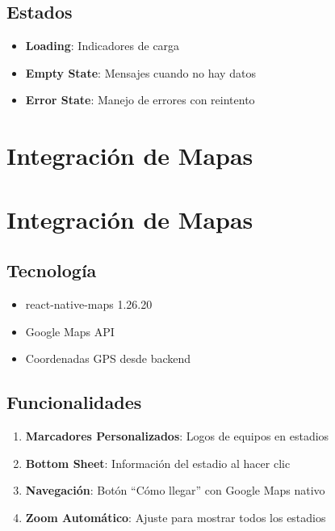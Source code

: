 \documentclass[
  spanish,
  11pt,
  letterpaper,
]{book}
\providecommand{\tightlist}{%
  \setlength{\itemsep}{0pt}\setlength{\parskip}{0pt}}
\begin{document}
\section{Estados}\label{estados}

\begin{itemize}
\tightlist
\item
  \textbf{Loading}: Indicadores de carga
\item
  \textbf{Empty State}: Mensajes cuando no hay datos
\item
  \textbf{Error State}: Manejo de errores con reintento
\end{itemize}

\chapter{Integración de Mapas}\label{integraciuxf3n-de-mapas}

\chapter{Integración de Mapas}\label{integraciuxf3n-de-mapas-1}

\section{Tecnología}\label{tecnologuxeda-1}

\begin{itemize}
\tightlist
\item
  react-native-maps 1.26.20
\item
  Google Maps API
\item
  Coordenadas GPS desde backend
\end{itemize}

\section{Funcionalidades}\label{funcionalidades}

\begin{enumerate}
\def\labelenumi{\arabic{enumi}.}
\tightlist
\item
  \textbf{Marcadores Personalizados}: Logos de equipos en estadios
\item
  \textbf{Bottom Sheet}: Información del estadio al hacer clic
\item
  \textbf{Navegación}: Botón ``Cómo llegar'' con Google Maps nativo
\item
  \textbf{Zoom Automático}: Ajuste para mostrar todos los estadios
\end{enumerate}
\end{document}
